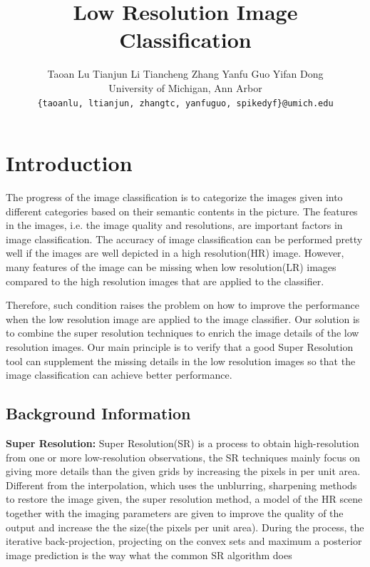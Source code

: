 \documentclass[10pt,twocolumn,letterpaper]{article}
\begin{document}
\title{Low Resolution Image Classification}


\author{Taoan Lu \qquad Tianjun Li \qquad Tiancheng Zhang \qquad Yanfu Guo \qquad Yifan Dong \\
University of Michigan, Ann Arbor\\
{\tt\small \{taoanlu, ltianjun, zhangtc, yanfuguo, spikedyf\}@umich.edu}}

\maketitle


\section{Introduction}
\par The progress of the image classification is to categorize the images given into different categories based on their semantic contents in the picture. The features in the images, i.e. the image quality and resolutions, are important factors in image classification. The accuracy of image classification can be performed pretty well if the images are well depicted in a high resolution(HR) image. However, many features of the image can be missing when low resolution(LR) images compared to the high resolution images that are applied to the classifier. 

\par Therefore, such condition raises the problem on how to improve the performance when the low resolution image are applied to the image classifier. Our solution is to combine the super resolution techniques to enrich the image details of the low resolution images. Our main principle is to verify that a good Super Resolution tool can supplement the missing details in the low resolution images so that the image classification can achieve better performance.

\subsection{Background Information}
\textbf{Super Resolution: } Super Resolution(SR) is a process to obtain high-resolution from one or more low-resolution observations\cite{Nasrollahi2014}, the SR techniques mainly focus on giving more details than the given grids by increasing the pixels in per unit area. Different from the interpolation, which uses the unblurring, sharpening methods to restore the image given\cite{Nasrollahi2014}, the super resolution method, a model of the HR scene together with the imaging parameters are given to improve the quality of the output and increase the the size(the pixels per unit area)\cite{Nasrollahi2014}. During the process, the iterative back-projection, projecting on the convex sets and maximum a posterior image prediction is the way what the common SR algorithm does \cite{papathanassiou_petrou_2005}
\end{document}
